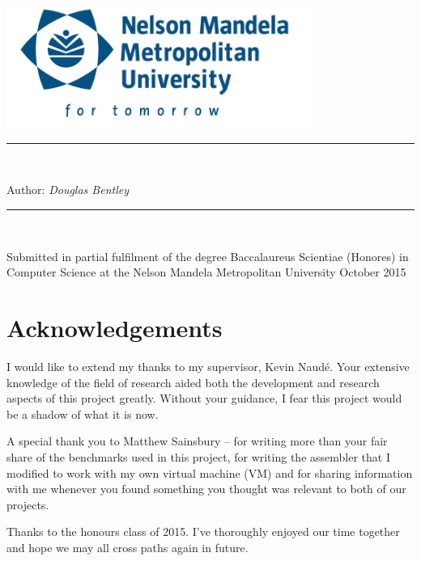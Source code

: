 \documentclass[english,a4paper,12pt]{report}
\newcommand{\HRule}{\rule{\linewidth}{0.5mm}}
\begin{document}
\begin{titlepage}
	\begin{center}
		\includegraphics[width=0.75\textwidth]{nmmu.png}
		{\color{NMMUBlue} \HRule \\[0.8cm]}
		{\color{NMMUBlue}{\huge \bfseries A JIT-Less Type-Mapped
            Dynamic-ISA Virtual Machine for Many-Instance Applications
            \\ [0.8cm]}} \vspace*{2\baselineskip} {\LARGE Author:
          \emph{Douglas Bentley}}\linebreak {}
		{\color{NMMUBlue} \HRule \\[0.4cm]} \vspace*{2\baselineskip}
        {\LARGE Submitted in partial fulfilment of the degree
          Baccalaureus Scientiae (Honores) in Computer Science at the
          Nelson Mandela Metropolitan University} \vfill
        \large{October 2015}
	\end{center}
\end{titlepage}

\newpage{}
\chapter*{Acknowledgements}

I would like to extend my thanks to my supervisor, Kevin
Naud\'{e}. Your extensive knowledge of the field of research aided
both the development and research aspects of this project
greatly. Without your guidance, I fear this project would be a shadow
of what it is now.

A special thank you to Matthew Sainsbury -- for writing more than your
fair share of the benchmarks used in this project, for writing the
assembler that I modified to work with my own virtual machine (VM) and
for sharing information with me whenever you found something you
thought was relevant to both of our projects.

Thanks to the honours class of 2015. I've thoroughly enjoyed our time
together and hope we may all cross paths again in future.
\end{document}
